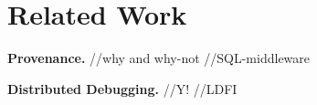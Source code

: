\section{Related Work} \label{rw}

\textbf{Provenance.} //why and why-not //SQL-middleware

\textbf{Distributed Debugging.} //Y! //LDFI
